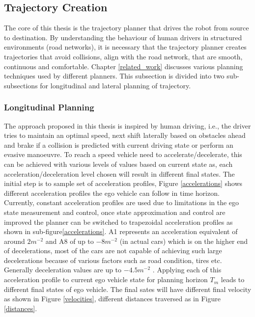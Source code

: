 \subsection{ Trajectory Creation} \label{traj_creation}

The core of this thesis is the trajectory planner that drives the robot from source to destination. By understanding the behaviour of human drivers in structured environments (road networks), it is necessary that the trajectory planner creates trajectories that avoid collisions, align with the road network, that are smooth, continuous and comfortable. Chapter \ref{related_work} discusses various planning techniques used by different planners. This subsection is divided into two sub-subsections for longitudinal and lateral planning of trajectory. 

\subsubsection{Longitudinal Planning}\label{lon_plan}
The approach proposed in this thesis is inspired by human driving, i.e., the driver tries to maintain an optimal speed, next shift laterally based on obstacles ahead and brake if a collision is predicted with current driving state or perform an evasive manoeuvre. To reach a speed vehicle need to accelerate/decelerate, this can be achieved with various levels of values based on current state as, each acceleration/deceleration level chosen will result in different final states. The initial step is to sample set of acceleration profiles, Figure \ref{accelerations} shows different acceleration profiles the ego vehicle can follow in time horizon. Currently, constant acceleration profiles are used due to limitations in the ego state measurement and control, once state approximation and control are improved the planner can be switched to trapezoidal acceleration profiles as shown in sub-figure\ref{accelerations}. A1 represents an acceleration equivalent of around $2m^{-2}$ and A8 of up to $-8m^{-2}$ (in actual cars) which is on the higher end of decelerations, most of the cars are not capable of achieving such large decelerations because of various factors such as road condition, tires etc. Generally deceleration values are up to $-4.5m^{-2}$ \cite{denmark_breaking} \cite{accelerations_study} \cite{accelerations_study_2}. Applying each of this acceleration profile to current ego vehicle state for planning horizon $ T_m $ leads to different final states of ego vehicle. The final sates will have different final velocity as shown in Figure \ref{velocities}, different distances traversed as in Figure \ref{distances}.

